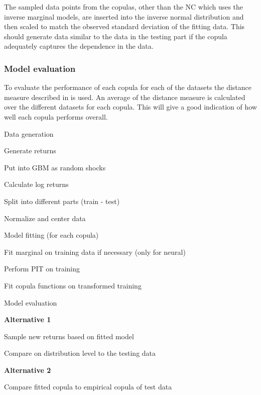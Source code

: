 The sampled data points from the copulas, other than the \gls{NC} which uses the inverse marginal models, are inserted into the inverse normal distribution and then scaled to match the observed standard deviation of the fitting data. This should generate data similar to the data in the testing part if the copula adequately captures the dependence in the data.

\subsubsection{Model evaluation}
To evaluate the performance of each copula for each of the datasets the distance measure described in  is used. An average of the distance measure is calculated over the different datasets for each copula. This will give a good indication of how well each copula performs overall. 


\begin{generalinstructions}
    \begin{compactenum}
        \item Data generation
        \begin{compactenum}
            \item Generate returns
            \item Put into GBM as random shocks 
            \item Calculate log returns 
            \item Split into different parts (train - test)
            \item Normalize and center data
        \end{compactenum}
        \item Model fitting (for each copula)
        \begin{compactenum}
            \item Fit marginal on training data if necessary (only for neural) 
            \item Perform PIT on training
            \item Fit copula functions on transformed training
        \end{compactenum}
        \item Model evaluation
        
        \textbf{Alternative 1}
        \begin{compactenum}
            \item Sample new returns based on fitted model
            \item Compare on distribution level to the testing data
        \end{compactenum}
        \textbf{Alternative 2}
        \begin{compactenum}
            \item Compare fitted copula to empirical copula of test data
        \end{compactenum}
    \end{compactenum}
\end{generalinstructions}


